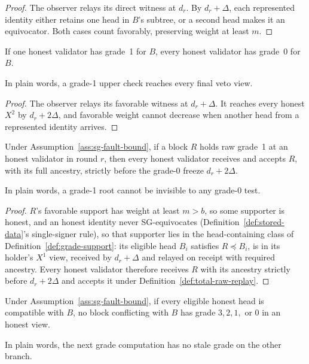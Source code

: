\begin{proof}
The observer relays its direct witness at \(d_r\).  By \(d_r+\Delta\), each
represented identity either retains one head in \(B\)'s subtree, or a second head
makes it an equivocator.  Both cases count favorably, preserving weight at
least \(m\).
\end{proof}

\begin{lemma}\label{lem:g1-g0}
If one honest validator has grade~1 for \(B\), every honest validator has
grade~0 for \(B\).

In plain words, a grade-1 upper check reaches every final veto view.
\end{lemma}

\begin{proof}
The observer relays its favorable witness at \(d_r+\Delta\).  It reaches
every honest \(X^2\) by \(d_r+2\Delta\), and favorable weight cannot decrease
when another head from a represented identity arrives.
\end{proof}

\begin{lemma}
\label{lem:g1-acceptance}
Under Assumption~\ref{ass:sg-fault-bound}, if a block \(R\) holds
raw grade~1 at an honest validator in round
\(r\), then every honest validator receives and accepts \(R\), with
its full ancestry, strictly before the grade-0 freeze \(d_r+2\Delta\).

In plain words, a grade-1 root cannot be invisible to any grade-0 test.
\end{lemma}

\begin{proof}
\(R\)'s favorable support has weight at least \(m>b\), so some
supporter is honest, and an honest identity never SG-equivocates
(Definition~\ref{def:stored-data}'s single-signer rule), so that
supporter lies in the head-containing class of
Definition~\ref{def:grade-support}: its eligible head \(B_i\)
satisfies \(R\preceq B_i\), is in its holder's \(X^1\) view,
received by \(d_r+\Delta\) and relayed on receipt with required
ancestry.  Every honest validator therefore receives \(R\) with its
ancestry strictly before \(d_r+2\Delta\) and accepts it under
Definition~\ref{def:total-raw-replay}.
\end{proof}

\begin{lemma}
\label{lem:fresh-support-clears}
Under Assumption~\ref{ass:sg-fault-bound}, if every eligible honest head is
compatible with \(B\), no block conflicting with \(B\) has grade
\(3,2,1,\) or \(0\) in an honest view.

In plain words, the next grade computation has no stale grade on the other
branch.
\end{lemma}

